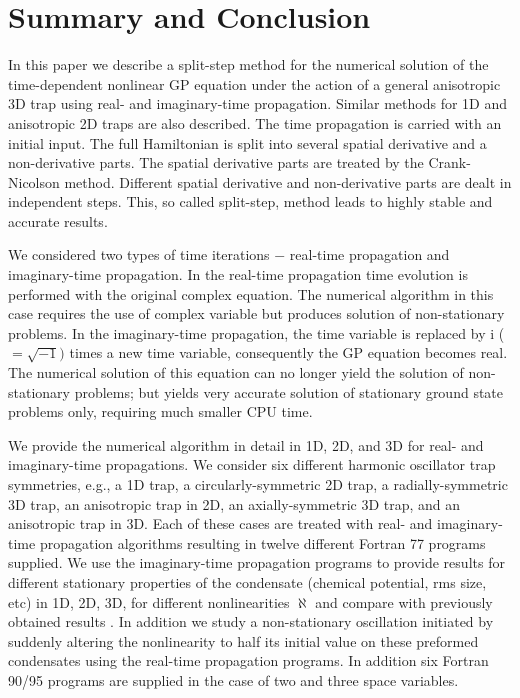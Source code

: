 \documentclass[onecolumn]{elsart3p}
\begin{document}
\section{Summary and Conclusion}
\label{SUM}

In this paper we describe a split-step method for the numerical solution
of the time-dependent nonlinear GP equation under the action of a
general anisotropic 3D trap using real- and imaginary-time propagation.
Similar methods for 1D and anisotropic 2D traps are also described. The
time propagation is carried with an initial input. The full Hamiltonian
is split into several spatial derivative and a non-derivative parts. The
spatial derivative parts are treated by the Crank-Nicolson method.
Different spatial derivative and non-derivative parts are dealt in
independent steps. This, so called  split-step, method leads to highly
stable and accurate results.

We considered two types of time iterations $-$ real-time propagation and
imaginary-time propagation. In the real-time propagation
time evolution  is performed with the original complex equation. The
numerical algorithm in this case requires the use of complex variable
but produces solution of non-stationary problems. In the imaginary-time
propagation, the time variable is replaced by i ($=\sqrt{-1})$ times a
new time variable, consequently the GP equation becomes real. The
numerical solution of this equation  can no longer yield the solution of
non-stationary problems; but yields very accurate solution of stationary 
ground state 
problems only, requiring  much smaller CPU time.

We provide the numerical algorithm in detail in 1D, 2D, and 3D for real-
and imaginary-time propagations.  We consider six different harmonic 
oscillator trap
symmetries, e.g., a  1D trap, a circularly-symmetric 2D trap, a
radially-symmetric 3D trap, an anisotropic trap in 2D, an
axially-symmetric 3D trap, and an anisotropic trap in 3D. Each of these
cases are treated with real- and imaginary-time propagation algorithms
resulting in twelve different Fortran 77 programs supplied. We use the
imaginary-time propagation programs to provide results for different
stationary properties of the condensate (chemical potential, rms size,
etc) in 1D, 2D, 3D, for different nonlinearities $\aleph $ %
and compare
with previously obtained results \cite{Bao_Tang,Schneider_Feder}. In
addition we study a non-stationary oscillation initiated by suddenly
altering the nonlinearity to half its initial value on these preformed
condensates using the real-time propagation programs. In addition six
Fortran 90/95 programs are supplied in the case of two and three space
variables.
\end{document}
